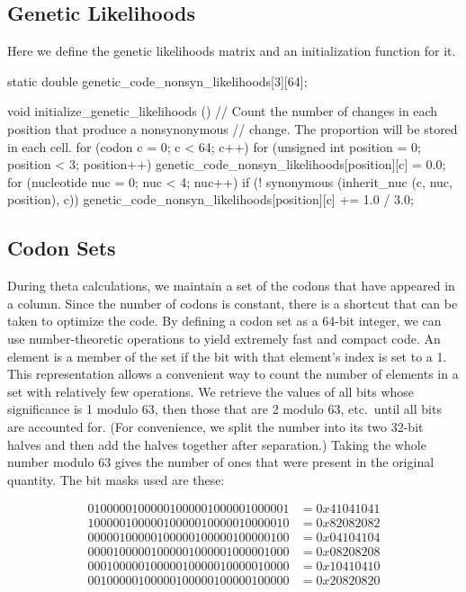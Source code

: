 \documentclass{article}
\begin{document}
    \subsection{Genetic Likelihoods}
      \label{sec:genetic-likelihoods}

      Here we define the genetic likelihoods matrix and an initialization
      function for it.

\begin{ccode}
static double genetic_code_nonsyn_likelihoods[3][64];

void initialize_genetic_likelihoods () {
  // Count the number of changes in each position that produce a nonsynonymous
  // change. The proportion will be stored in each cell.
  for (codon c = 0; c < 64; c++)
    for (unsigned int position = 0; position < 3; position++) {
      genetic_code_nonsyn_likelihoods[position][c] = 0.0;
      for (nucleotide nuc = 0; nuc < 4; nuc++)
	if (! synonymous (inherit_nuc (c, nuc, position), c))
	  genetic_code_nonsyn_likelihoods[position][c] += 1.0 / 3.0;
    }
}
\end{ccode}

    \subsection{Codon Sets}
      \label{sec:codon-sets}

      During theta calculations, we maintain a set of the codons that have
      appeared in a column. Since the number of codons is constant, there is a
      shortcut that can be taken to optimize the code. By defining a codon set
      as a 64-bit integer, we can use number-theoretic operations to yield
      extremely fast and compact code. An element is a member of the set if the
      bit with that element's index is set to a 1. This representation allows a
      convenient way to count the number of elements in a set with relatively
      few operations. We retrieve the values of all bits whose significance is 1
      modulo 63, then those that are 2 modulo 63, etc.\ until all bits are
      accounted for. (For convenience, we split the number into its two 32-bit
	  halves and then add the halves together after separation.) Taking the
      whole number modulo 63 gives the number of ones that were present in the
      original quantity. The bit masks used are these:

      \begin{align*}
        01000001000001000001000001000001 & = 0x41041041 \\ %
        10000010000010000010000010000010 & = 0x82082082 \\ %
        00000100000100000100000100000100 & = 0x04104104 \\ %
        00001000001000001000001000001000 & = 0x08208208 \\ %
        00010000010000010000010000010000 & = 0x10410410 \\ %
        00100000100000100000100000100000 & = 0x20820820
      \end{align*}
\end{document}
